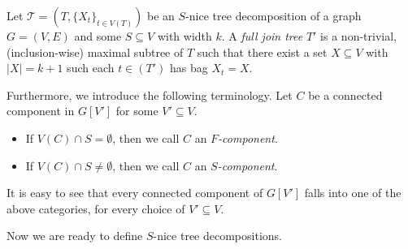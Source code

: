 \documentclass[a4paper,UKenglish,cleveref, autoref, thm-restate, numberwithinsect]{lipics-v2021}
\newcommand{\slim}{\text{slim}\xspace}
\begin{document}
\begin{definition}\label{def:fulljointree}
Let $\mathcal{T}=(T,\{X_t\}_{t\in V(T)})$ be an $S$-nice tree decomposition of a graph $G=(V,E)$ and some $S\subseteq V$ with width $k$. 
A \emph{full join tree} $T'$ is a non-trivial, (inclusion-wise) maximal subtree of $T$ such that there exist a set $X\subseteq V$ with $|X|=k+1$ such each $t\in (T')$ has bag $X_t=X$.
\end{definition}
Furthermore, we introduce the following terminology. 
Let $C$ be a connected component in $G[V']$ for some $V'\subseteq V$. 
\begin{itemize}
    \item If $V(C)\cap S=\emptyset$, then we call $C$ an \emph{$F$-component}. \item If $V(C)\cap S\neq\emptyset$, then we call $C$ an \emph{$S$-component}.
\end{itemize}
It is easy to see that every connected component of $G[V']$ falls into one of the above categories, for every choice of $V'\subseteq V$. 

Now we are ready to define \emph{\slim} $S$-nice tree decompositions.
\end{document}
